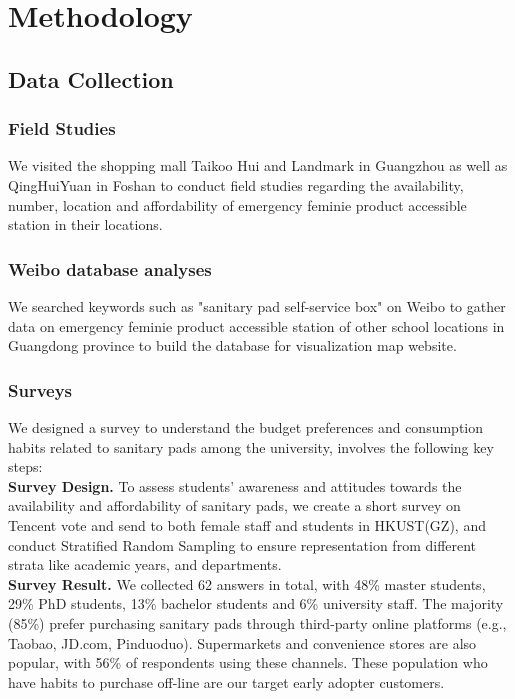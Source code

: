 \section{Methodology}
\subsection{Data Collection}
\subsubsection{Field Studies}
We visited the shopping mall Taikoo Hui and Landmark in Guangzhou as well as QingHuiYuan in Foshan to conduct field studies regarding the availability, number, location and affordability of emergency feminie product accessible station in their locations.

\subsubsection{Weibo database analyses}

We searched keywords such as "sanitary pad self-service box" on Weibo to gather data on emergency feminie product accessible station of other school locations in Guangdong province to build the database for visualization map website.

\subsubsection{Surveys}
We designed a survey to understand the budget preferences and consumption habits related to sanitary pads among the university, involves the following key steps:\\

\textbf{Survey Design.}
To assess students' awareness and attitudes towards the availability and affordability of sanitary pads, we create a short survey on Tencent vote and send to both female staff and students in HKUST(GZ), and conduct Stratified Random Sampling to ensure representation from different strata like academic years, and departments.\\

\textbf{Survey Result.}
We collected 62 answers in total, with 48\% master students, 29\% PhD students, 13\% bachelor students and 6\% university staff. The majority (85\%) prefer purchasing sanitary pads through third-party online platforms (e.g., Taobao, JD.com, Pinduoduo). Supermarkets and convenience stores are also popular, with 56\% of respondents using these channels. These population who have habits to purchase off-line are our target early adopter customers.\\


